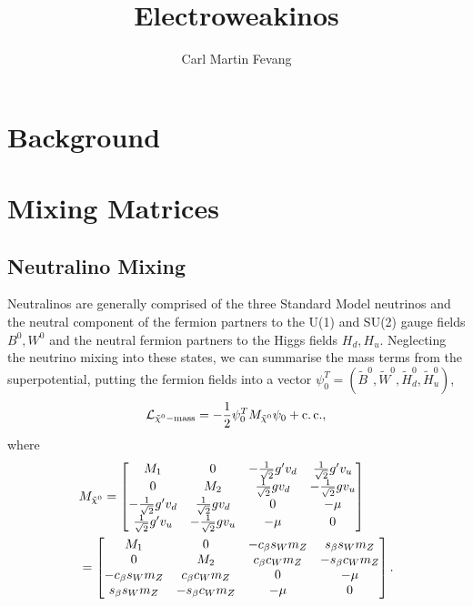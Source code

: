 \documentclass[a4paper,10pt]{article}
\author{Carl Martin Fevang}
\title{Electroweakinos}
\begin{document}
\maketitle

\section{Background}


\section{Mixing Matrices}
    \subsection{Neutralino Mixing}
        Neutralinos are generally comprised of the three Standard Model neutrinos and the neutral component of the fermion partners to the U(1) and SU(2) gauge fields $B^0, W^0$ and the neutral fermion partners to the Higgs fields $H_d, H_u$. Neglecting the neutrino mixing into these states, we can summarise the mass terms from the superpotential, putting the fermion fields into a vector $\psi_0^T = (\tilde{B}^0, \tilde{W}^0, \tilde{H}^0_d, \tilde{H}^0_u)$,
        \begin{align}
            \mathcal{L}_{\tilde{\chi}^0_{}\mathrm{-mass}} = -\frac{1}{2} \psi_0^T M_{\tilde{\chi}^0_{}} \psi_0 + \operatorname{c.c.},
        \end{align}
        where
        \begin{subequations}
            \begin{align}
                &M_{\tilde{\chi}^0_{}} = \begin{bmatrix}
                    M_1 & 0 & -\frac{1}{\sqrt{2}} g' v_d & \frac{1}{\sqrt{2}} g' v_u \\
                    0 & M_2 & \frac{1}{\sqrt{2}} g v_d & -\frac{1}{\sqrt{2}} g v_u \\
                    -\frac{1}{\sqrt{2}} g' v_d & \frac{1}{\sqrt{2}} g v_d & 0 & -\mu \\
                    \frac{1}{\sqrt{2}} g' v_u & -\frac{1}{\sqrt{2}} g v_u & -\mu & 0
                \end{bmatrix} \\
                &= \begin{bmatrix}
                    M_1 & 0 & -c_\beta s_W m_Z & s_\beta s_W m_Z \\
                    0 & M_2 & c_\beta c_W m_Z & -s_\beta c_W m_Z \\
                    -c_\beta s_W m_Z & c_\beta c_W m_Z & 0 & -\mu \\
                    s_\beta s_W m_Z & -s_\beta c_W m_Z & -\mu & 0
                \end{bmatrix}.
            \end{align}
        \end{subequations}
\end{document}
